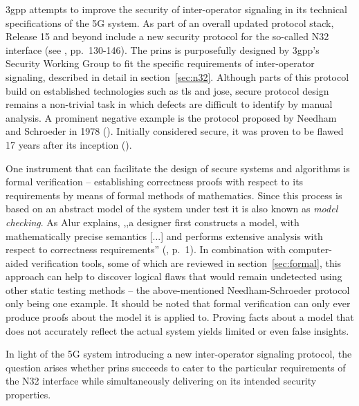 \gls{3gpp} attempts to improve the security of inter-operator signaling in its technical specifications of the 5G system.
As part of an overall updated protocol stack, Release 15 and beyond include a new security protocol for the so-called N32 interface (see \cite{3gpp.33.501}, pp.~130-146).
The \gls{prins} is purposefully designed by \gls{3gpp}'s Security Working Group to fit the specific requirements of inter-operator signaling, described in detail in section~\ref{sec:n32}.
Although parts of this protocol build on established technologies such as \gls{tls} and \gls{jose}, secure protocol design remains a non-trivial task in which defects are difficult to identify by manual analysis.
A prominent negative example is the protocol proposed by Needham and Schroeder in 1978 (\cite{needham1978using}).
Initially considered secure, it was proven to be flawed 17 years after its inception (\cite{lowe1996breaking}).

One instrument that can facilitate the design of secure systems and algorithms is formal verification -- establishing correctness proofs with respect to its requirements by means of formal methods of mathematics.
Since this process is based on an abstract model of the system under test it is also known as \textit{model checking}.
As Alur explains, ,,a designer first constructs a model, with mathematically precise semantics [...] and performs extensive analysis with respect to correctness requirements'' (\cite{alur2011formal}, p.~1).
In combination with computer-aided verification tools, some of which are reviewed in section~\ref{sec:formal}, this approach can help to discover logical flaws that would remain undetected using other static testing methods -- the above-mentioned Needham-Schroeder protocol only being one example.
It should be noted that formal verification can only ever produce proofs about the model it is applied to.
Proving facts about a model that does not accurately reflect the actual system yields limited or even false insights.

In light of the 5G system introducing a new inter-operator signaling protocol, the question arises whether \gls{prins} succeeds to cater to the particular requirements of the N32 interface while simultaneously delivering on its intended security properties.
